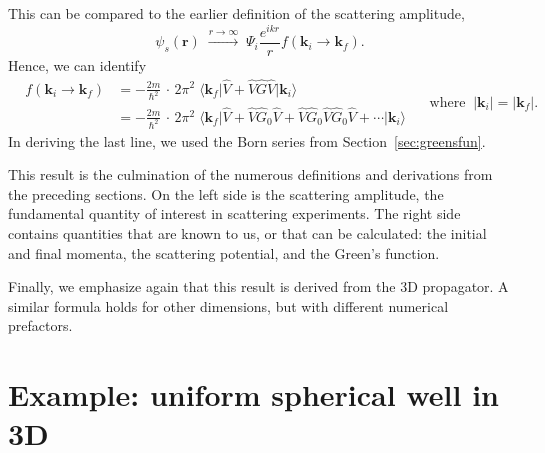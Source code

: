\documentclass[pra,12pt]{revtex4}
\begin{document}
This can be compared to the earlier definition of the scattering amplitude,
\begin{equation}
  \psi_s(\mathbf{r}) \; \overset{r\rightarrow\infty}{\longrightarrow} \; \Psi_i \frac{e^{ikr}}{r} f(\mathbf{k}_i\rightarrow \mathbf{k}_f ).
\end{equation}
Hence, we can identify
$$\boxed{\;\;\;\begin{aligned}f(\mathbf{k}_i \rightarrow \mathbf{k}_f) &= - \frac{2m}{\hbar^2} \,\cdot \, 2\pi^2 \; \big\langle \mathbf{k}_f\big| \hat{V} + \hat{V}\hat{G} \hat{V} \big|\mathbf{k}_i\big\rangle \\ &= - \frac{2m}{\hbar^2} \,\cdot \, 2\pi^2 \; \big\langle \mathbf{k}_f\big| \hat{V} + \hat{V}\hat{G}_0 \hat{V} + \hat{V} \hat{G}_0 \hat{V} \hat{G}_0\hat{V} + \cdots \big|\mathbf{k}_i\big\rangle  \end{aligned}\quad\; \mathrm{where}\;\; |\mathbf{k}_i| = |\mathbf{k}_f|.\;\;\;}$$
In deriving the last line, we used the Born series from
Section~\ref{sec:greensfun}.

This result is the culmination of the numerous definitions and
derivations from the preceding sections.  On the left side is the
scattering amplitude, the fundamental quantity of interest in
scattering experiments.  The right side contains quantities that are
known to us, or that can be calculated: the initial and final momenta,
the scattering potential, and the Green's function.

Finally, we emphasize again that this result is derived from the 3D
propagator.  A similar formula holds for other dimensions, but with
different numerical prefactors.

\section{Example: uniform spherical well in 3D}
\end{document}
